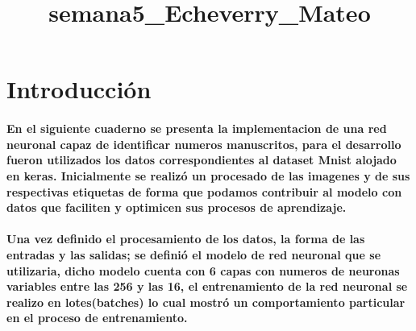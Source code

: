 \documentclass[11pt]{article}
\title{semana5\_Echeverry\_Mateo}
\begin{document}
    
    \maketitle
    
    

    
    \section{Introducción}\label{introducciuxf3n}

\paragraph{En el siguiente cuaderno se presenta la implementacion de una
red neuronal capaz de identificar numeros manuscritos, para el
desarrollo fueron utilizados los datos correspondientes al dataset Mnist
alojado en keras. Inicialmente se realizó un procesado de las imagenes y
de sus respectivas etiquetas de forma que podamos contribuir al modelo
con datos que faciliten y optimicen sus procesos de
aprendizaje.}\label{en-el-siguiente-cuaderno-se-presenta-la-implementacion-de-una-red-neuronal-capaz-de-identificar-numeros-manuscritos-para-el-desarrollo-fueron-utilizados-los-datos-correspondientes-al-dataset-mnist-alojado-en-keras.-inicialmente-se-realizuxf3-un-procesado-de-las-imagenes-y-de-sus-respectivas-etiquetas-de-forma-que-podamos-contribuir-al-modelo-con-datos-que-faciliten-y-optimicen-sus-procesos-de-aprendizaje.}

\paragraph{Una vez definido el procesamiento de los datos, la forma de
las entradas y las salidas; se definió el modelo de red neuronal que se
utilizaria, dicho modelo cuenta con 6 capas con numeros de neuronas
variables entre las 256 y las 16, el entrenamiento de la red neuronal se
realizo en lotes(batches) lo cual mostró un comportamiento particular en
el proceso de
entrenamiento.}\label{una-vez-definido-el-procesamiento-de-los-datos-la-forma-de-las-entradas-y-las-salidas-se-definiuxf3-el-modelo-de-red-neuronal-que-se-utilizaria-dicho-modelo-cuenta-con-6-capas-con-numeros-de-neuronas-variables-entre-las-256-y-las-16-el-entrenamiento-de-la-red-neuronal-se-realizo-en-lotesbatches-lo-cual-mostruxf3-un-comportamiento-particular-en-el-proceso-de-entrenamiento.}
\end{document}
